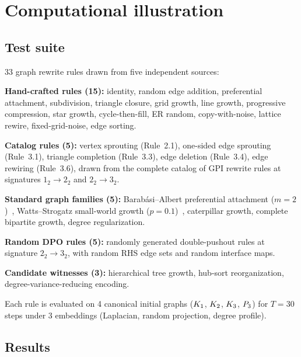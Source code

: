 \documentclass{../shared/primo}
\begin{document}
\section{Computational illustration}
\label{sec:computation}

\subsection{Test suite}

33 graph rewrite rules drawn from five independent sources:

\textbf{Hand-crafted rules (15):} identity, random edge addition, preferential attachment, subdivision, triangle closure, grid growth, line growth, progressive compression, star growth, cycle-then-fill, ER random, copy-with-noise, lattice rewire, fixed-grid-noise, edge sorting.

\textbf{Catalog rules (5):} vertex sprouting (Rule~2.1), one-sided edge sprouting (Rule~3.1), triangle completion (Rule~3.3), edge deletion (Rule~3.4), edge rewiring (Rule~3.6), drawn from the complete catalog of GPI rewrite rules at signatures $1_2 \to 2_2$ and $2_2 \to 3_2$.

\textbf{Standard graph families (5):} Barab\'asi--Albert preferential attachment ($m = 2$)~\cite{barabasi1999emergence}, Watts--Strogatz small-world growth ($p = 0.1$)~\cite{watts1998collective}, caterpillar growth, complete bipartite growth, degree regularization.

\textbf{Random DPO rules (5):} randomly generated double-pushout rules at signature $2_2 \to 3_2$, with random RHS edge sets and random interface maps.

\textbf{Candidate witnesses (3):} hierarchical tree growth, hub-sort reorganization, degree-variance-reducing encoding.

Each rule is evaluated on 4 canonical initial graphs ($K_{1}$, $K_{2}$, $K_{3}$, $P_{3}$) for $T = 30$ steps under 3 embeddings (Laplacian, random projection, degree profile).

\subsection{Results}
\end{document}
